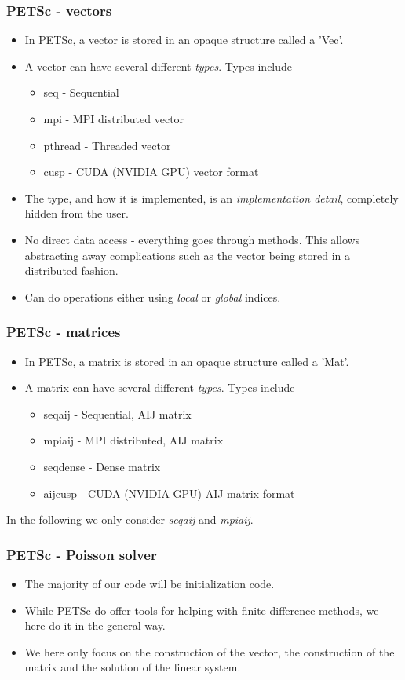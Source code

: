 \documentclass{beamer}
\begin{document}
\begin{frame}\frametitle{PETSc - vectors}
  \begin{itemize}
    \item In PETSc, a vector is stored in an opaque structure called a 'Vec'.
    \item A vector can have several different \emph{types}. Types include
      \begin{itemize}
        \item seq  - Sequential
        \item mpi  - MPI distributed vector
        \item pthread - Threaded vector
        \item cusp - CUDA (NVIDIA GPU) vector format
      \end{itemize}
    \item The type, and how it is implemented, is an \emph{implementation detail},
      completely hidden from the user.
    \item No direct data access - everything goes through methods. This allows
      abstracting away complications such as the vector being stored in a distributed fashion.
    \item Can do operations either using \emph{local} or \emph{global} indices.
  \end{itemize}
\end{frame}

\begin{frame}\frametitle{PETSc - matrices}
  \begin{itemize}
    \item In PETSc, a matrix is stored in an opaque structure called a 'Mat'.
    \item A matrix can have several different \emph{types}. Types include
      \begin{itemize}
        \item seqaij  - Sequential, AIJ matrix
        \item mpiaij  - MPI distributed, AIJ matrix
        \item seqdense - Dense matrix
        \item aijcusp - CUDA (NVIDIA GPU) AIJ matrix format
      \end{itemize}
  \end{itemize}
  In the following we only consider \emph{seqaij} and \emph{mpiaij}.
\end{frame}

\begin{frame}\frametitle{PETSc - Poisson solver}
  \begin{itemize}
    \item The majority of our code will be initialization code.
    \item While PETSc do offer tools for helping with finite difference methods,
        we here do it in the general way.
    \item We here only focus on the construction of the vector, the 
        construction of the matrix and the solution of the linear system.
  \end{itemize}
\end{frame}
\end{document}
